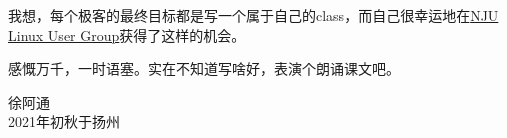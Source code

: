 \begin{preface}

我想，每个极客的最终目标都是写一个属于自己的class，而自己很幸运地在\href{https://git.nju.edu.cn/nju-lug/lug-introduction}{NJU Linux User Group}获得了这样的机会。

感慨万千，一时语塞。实在不知道写啥好，表演个朗诵课文吧。

\zhlipsum[108-110][name=zhufu]

\vspace{1cm}
\begin{flushright}
徐阿通\\
2021年初秋于扬州
\end{flushright}

\end{preface}
